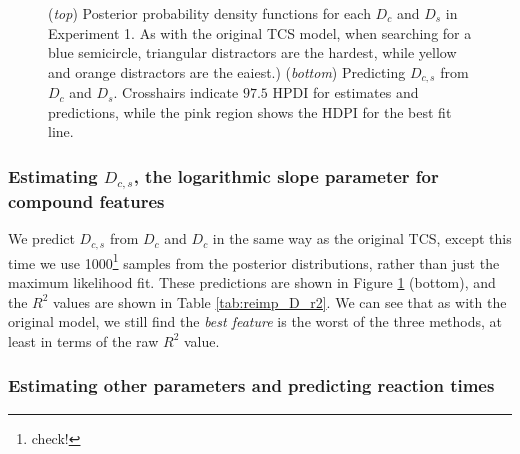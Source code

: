 \documentclass[smallextended, natbib]{svjour3}       %
\begin{document}
\begin{figure}
\centering
{}
\caption{(\textit{top}) Posterior probability density functions for each $D_c$ and $D_s$ in Experiment 1. As with the original TCS model, when searching for a blue semicircle, triangular distractors are the hardest, while yellow and orange distractors are the eaiest.) (\textit{bottom}) Predicting $D_{c,s}$ from $D_c$ and $D_s$. Crosshairs indicate $97.5$ HPDI for estimates and predictions, while the pink region shows the HDPI for the best fit line. }
\label{fig:buetti2019_D}
\end{figure}

\subsubsection{Estimating $D_{c,s}$, the logarithmic slope parameter for compound features}

We predict $D_{c,s}$ from $D_c$ and $D_c$ in the same way as the original TCS, except this time we use 1000\footnote{check!} samples from the posterior distributions, rather than just the maximum likelihood fit. These predictions are shown in Figure \ref{fig:buetti2019_D} (bottom), and the $R^2$ values are shown in Table \ref{tab:reimp_D_r2}. We can see that as with the original model, we still find the \textit{best feature} is the worst of the three methods, at least in terms of the raw $R^2$ value.

\subsubsection{Estimating other parameters and predicting reaction times}
\end{document}
